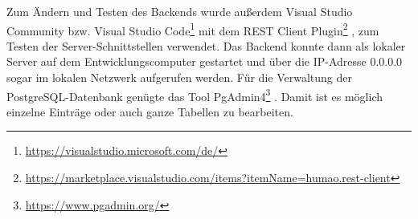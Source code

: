\documentclass[nomenclature, oneside, 150]{HSMW-Thesis}
\begin{document}
		Zum Ändern und Testen des Backends wurde außerdem Visual Studio Community bzw. Visual Studio Code\footnote{\href{https://visualstudio.microsoft.com/de/}{\url{https://visualstudio.microsoft.com/de/}}} mit dem REST Client Plugin\footnote{\href{https://marketplace.visualstudio.com/items?itemName=humao.rest-client}{\url{https://marketplace.visualstudio.com/items?itemName=humao.rest-client}}} , zum Testen der Server-Schnittstellen verwendet. Das Backend konnte dann als lokaler Server auf dem Entwicklungscomputer gestartet und über die IP-Adresse 0.0.0.0 sogar im lokalen Netzwerk aufgerufen werden. Für die Verwaltung der PostgreSQL-Datenbank genügte das Tool PgAdmin4\footnote{\href{https://www.pgadmin.org/}{\url{https://www.pgadmin.org/}}} . Damit ist es möglich einzelne Einträge oder auch ganze Tabellen zu bearbeiten.
			
\end{document}
